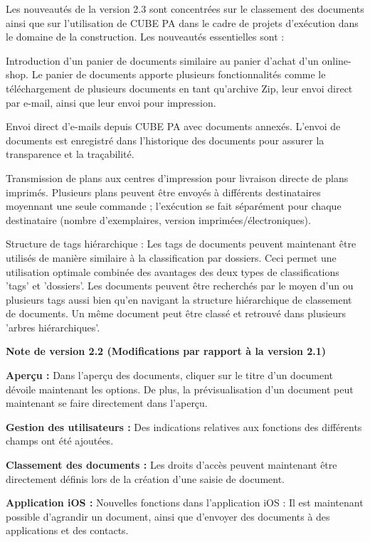 Les nouveautés de la version 2.3 sont concentrées sur le classement des documents ainsi que sur l'utilisation de CUBE PA dans le cadre de projets d'exécution dans le domaine de la construction. Les nouveautés essentielles sont :
\begin{compactitem}
	\item Introduction d'un panier de documents similaire au panier d'achat d'un online-shop. Le panier de documents apporte plusieurs fonctionnalités comme le téléchargement de plusieurs documents en tant qu'archive Zip, leur envoi direct par e-mail, ainsi que leur envoi pour impression.
	\item Envoi direct d'e-mails depuis CUBE PA avec documents annexés. L'envoi de documents est enregistré dans l'historique des documents pour assurer la transparence et la traçabilité.
	\item Transmission de plans aux centres d'impression pour livraison directe de plans imprimés. Plusieurs plans peuvent être envoyés à différents destinataires moyennant une seule commande ; l'exécution se fait séparément pour chaque destinataire (nombre d'exemplaires, version imprimées/électroniques).
	\item Structure de tags hiérarchique : Les tags de documents peuvent maintenant être utilisés de manière similaire à la classification par dossiers. Ceci permet une utilisation optimale combinée des avantages des deux types de classifications 'tags' et 'dossiers'. Les documents peuvent être recherchés par le moyen d'un ou plusieurs tags aussi bien qu'en navigant la structure hiérarchique de classement de documents. Un même document peut être classé et retrouvé dans plusieurs 'arbres hiérarchiques'.
\end{compactitem}

\vspace{\baselineskip}

\textbf{Note de version 2.2 (Modifications par rapport à la version 2.1)} \\

\begin{compactitem}
	\item \textbf{Aperçu :} Dans l'aperçu des documents, cliquer sur le titre d'un document dévoile maintenant les options. De plus, la prévisualisation d'un document peut maintenant se faire directement dans l'aperçu.
	\item \textbf{Gestion des utilisateurs :} Des indications relatives aux fonctions des différents champs ont été ajoutées.
	\item \textbf{Classement des documents :} Les droits d'accès peuvent maintenant être directement définis lors de la création d'une saisie de document.
	\item \textbf{Application iOS :} Nouvelles fonctions dans l'application iOS : Il est maintenant possible d'agrandir un document, ainsi que d'envoyer des documents à des applications et des contacts.
\end{compactitem}

